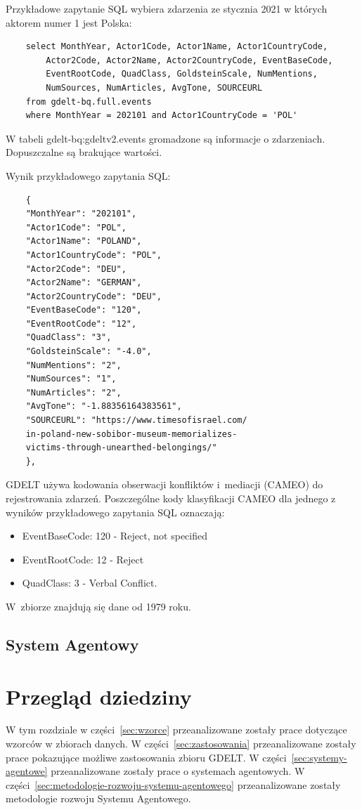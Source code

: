 \documentclass[11pt]{report}
\begin{document}
    Przykładowe zapytanie SQL wybiera zdarzenia ze stycznia 2021 w których aktorem numer 1 jest Polska:

    \begin{verbatim}
    select MonthYear, Actor1Code, Actor1Name, Actor1CountryCode,
        Actor2Code, Actor2Name, Actor2CountryCode, EventBaseCode,
        EventRootCode, QuadClass, GoldsteinScale, NumMentions,
        NumSources, NumArticles, AvgTone, SOURCEURL
    from gdelt-bq.full.events
    where MonthYear = 202101 and Actor1CountryCode = 'POL'
    \end{verbatim}

    W tabeli gdelt-bq:gdeltv2.events gromadzone są informacje o zdarzeniach.
    Dopuszczalne są brakujące wartości.

    Wynik przykładowego zapytania SQL:~\begin{verbatim}
    {
    "MonthYear": "202101",
    "Actor1Code": "POL",
    "Actor1Name": "POLAND",
    "Actor1CountryCode": "POL",
    "Actor2Code": "DEU",
    "Actor2Name": "GERMAN",
    "Actor2CountryCode": "DEU",
    "EventBaseCode": "120",
    "EventRootCode": "12",
    "QuadClass": "3",
    "GoldsteinScale": "-4.0",
    "NumMentions": "2",
    "NumSources": "1",
    "NumArticles": "2",
    "AvgTone": "-1.88356164383561",
    "SOURCEURL": "https://www.timesofisrael.com/
    in-poland-new-sobibor-museum-memorializes-
    victims-through-unearthed-belongings/"
    },
    \end{verbatim}

    GDELT używa kodowania obserwacji konfliktów i~mediacji (CAMEO) do rejestrowania zdarzeń.
    Poszczególne kody klasyfikacji CAMEO dla jednego z wyników przykładowego zapytania SQL oznaczają:
    \begin{itemize}
        \item EventBaseCode: 120 - Reject, not specified
        \item EventRootCode: 12 - Reject
        \item QuadClass: 3 - Verbal Conflict.
    \end{itemize}

    W~zbiorze znajdują się dane od 1979 roku.


    \section{System Agentowy}


    \chapter{Przegląd dziedziny}\label{ch:przegląd-dziedziny}
    W tym rozdziale w części~\ref{sec:wzorce} przeanalizowane zostały prace dotyczące wzorców w zbiorach danych.
    W części~\ref{sec:zastosowania} przeanalizowane zostały prace pokazujące możliwe zastosowania zbioru GDELT\@.
    W części~\ref{sec:systemy-agentowe} przeanalizowane zostały prace o systemach agentowych.
    W części~\ref{sec:metodologie-rozwoju-systemu-agentowego} przeanalizowane zostały metodologie rozwoju Systemu Agentowego.
\end{document}
